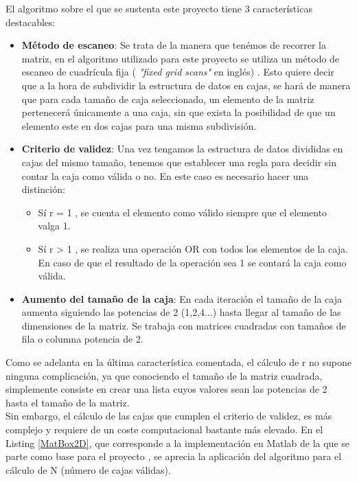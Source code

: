 El algoritmo sobre el que se sustenta este proyecto tiene 3 características destacables:

\begin{itemize}
    \item \textbf{Método de escaneo}: Se trata de la manera que tenémos de recorrer la matriz, en el algoritmo utilizado para este proyecto se utiliza un método de escaneo de cuadrícula fija ( \textit{"fixed grid scans"} en inglés) \cite{unknown-author-no-dateF}. Esto quiere decir que a la hora de subdividir la estructura de datos en cajas, se hará de manera que para cada tamaño de caja seleccionado, un elemento de la matriz pertenecerá únicamente a una caja, sin que exista la posibilidad de que un elemento este en dos cajas para una misma subdivisión.
    \item \textbf{Criterio de validez}: Una vez tengamos la estructura de datos divididas en cajas del mismo tamaño, tenemos que establecer una regla para decidir sin contar la caja como válida o no. En este caso es necesario hacer una distinción:
    \begin{itemize}
        \item Sí  r = 1 , se cuenta el elemento como válido siempre que el elemento valga 1.
        \item Sí  r > 1 , se realiza una operación OR con todos los elementos de la caja. En caso de que el resultado de la operación sea 1 se contará la caja como válida. 
    \end{itemize}
    \item \textbf{Aumento del tamaño de la caja}: En cada iteración el tamaño de la caja aumenta siguiendo las potencias de 2 (1,2,4...) hasta llegar al tamaño de las dimensiones de la matriz. Se trabaja con matrices cuadradas con tamaños de fila o columna potencia de 2.
\end{itemize}


Como se adelanta en la última característica comentada, el cálculo de r no supone ninguna complicación, ya que conociendo el tamaño de la matriz cuadrada, simplemente consiste en crear una lista cuyos valores sean las potencias de 2 hasta el tamaño de la matriz.\\

Sin embargo, el cálculo de las cajas que cumplen el criterio de validez, es más complejo y requiere de un coste computacional bastante más elevado. En el Listing \ref{MatBox2D}, que corresponde a la implementación en Matlab de la que se parte como base para el proyecto \cite{unknown-author-2008}, se aprecia la aplicación del algoritmo para el cálculo de N (número de cajas válidas).\\

